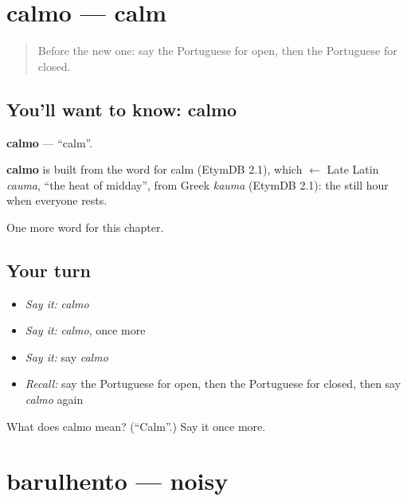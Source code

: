 \section[calmo]{calmo — calm}

\label{lesson:PT-C122-calmo}



\begin{quote}
Before the new one: say the Portuguese for open, then the Portuguese for closed.
\end{quote}

\subsection*{You'll want to know: calmo}
\textbf{calmo} — \textquotedblleft{}calm\textquotedblright{}.

\begin{cousinweb}
\textbf{calmo} is built from the word for calm (EtymDB 2.1), which $\leftarrow$ Late Latin \emph{cauma}, \textquotedblleft{}the heat of midday\textquotedblright{}, from Greek \emph{kauma} (EtymDB 2.1): the still hour when everyone rests.
\end{cousinweb}

\begin{grammarlens}[title={What you've built}]
One more word for this chapter.
\end{grammarlens}

\subsection*{Your turn}
\begin{itemize}
\raggedright
  \item \emph{Say it:} \emph{calmo}
  \item \emph{Say it:} \emph{calmo}, once more
  \item \emph{Say it:} say \emph{calmo}
  \item \emph{Recall:} say the Portuguese for open, then the Portuguese for closed, then say \emph{calmo} again
\end{itemize}

\begin{tcolorbox}[breakable,colback=teal!4,colframe=teal!35!black,title={Before you move on}]
What does calmo mean? (\textquotedblleft{}Calm\textquotedblright{}.) Say it once more.
\end{tcolorbox}
\section[barulhento]{barulhento — noisy}

